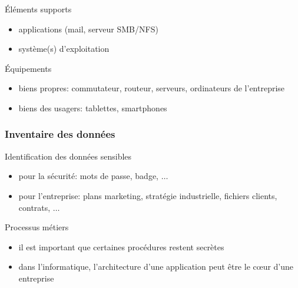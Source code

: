 \begin{reveals}
\begin{frame}
  \vfill

\begin{block}{Éléments supports}
  \begin{itemize}
  \item applications (mail, serveur SMB/NFS)
  \item système(s) d'exploitation
  \end{itemize}
  \end{block}

  \vfill

\begin{block}{Équipements}
  \begin{itemize}
  \item biens propres: commutateur, routeur, serveurs, ordinateurs de l'entreprise
  \item biens des usagers: tablettes, smartphones
  \end{itemize}
  \end{block}

  \vfill



\end{frame}


\begin{frame}
  \frametitle{Inventaire des données}

  \vfill

   \begin{block}{Identification des données sensibles}
     \begin{itemize}
     \item pour la sécurité: mots de passe, badge, \(\ldots\)
     \item pour l'entreprise: plans marketing, stratégie industrielle,
       fichiers clients, contrats, \(\ldots\)
     \end{itemize}
  \end{block}

  \vfill

\begin{block}{Processus métiers}
  \begin{itemize}
  \item il est important que certaines procédures restent secrètes
  \item dans l'informatique, l'architecture d'une application peut
    être le c\oe ur d'une entreprise
  \end{itemize}
  \end{block}

  \vfill


\end{frame}
\end{reveals}
